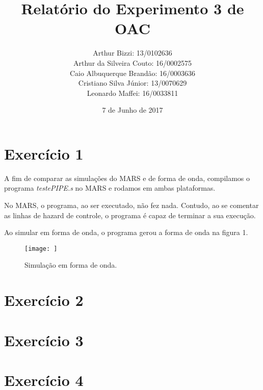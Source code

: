 \documentclass[12pt, a4paper, twoside]{article}
\begin{document}
\title{Relatório do Experimento 3 de OAC}
\author{
Arthur Bizzi: 13/0102636 \\
Arthur da Silveira Couto: 16/0002575 \\
Caio Albuquerque Brandão: 16/0003636 \\
Cristiano Silva Júnior: 13/0070629 \\
Leonardo Maffei: 16/0033811 \\}
\date{7 de Junho de 2017}
\maketitle

\section{Exercício 1}

A fim de comparar as simulações do MARS e de forma de onda, compilamos o programa \textit{testePIPE.s} no MARS e rodamos em ambas plataformas.

No MARS, o programa, ao ser executado, não fez nada. Contudo, ao se comentar as linhas de hazard de controle, o programa é capaz de terminar a sua execução.

Ao simular em forma de onda, o programa gerou a forma de onda na figura 1.

\begin{figure}
    \centering
    \texttt{[image: ]}
    \caption{Simulação em forma de onda.}
\end{figure}

\section{Exercício 2}


\section{Exercício 3}


\section{Exercício 4}

\end{document}
